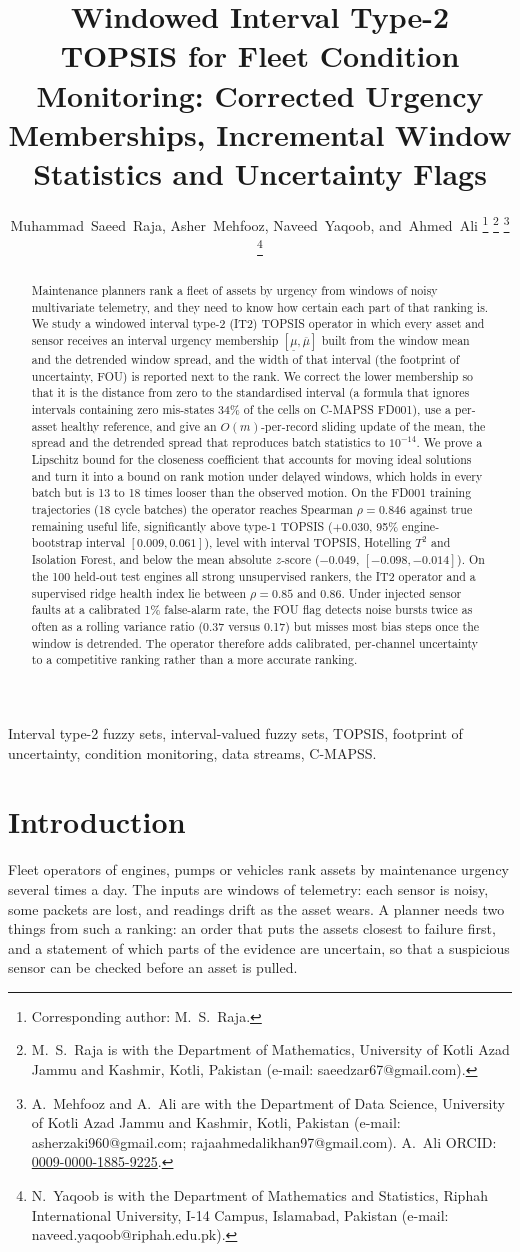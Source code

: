 \documentclass[journal,10pt,twocolumn]{IEEEtran}
\title{Windowed Interval Type-2 TOPSIS for Fleet Condition Monitoring: Corrected Urgency Memberships, Incremental Window Statistics and Uncertainty Flags}
\author{Muhammad~Saeed~Raja,
        Asher~Mehfooz,
        Naveed~Yaqoob,
        and~Ahmed~Ali%
\thanks{Corresponding author: M.~S.~Raja.}%
\thanks{M.~S.~Raja is with the Department of Mathematics, University of Kotli Azad Jammu and Kashmir, Kotli, Pakistan (e-mail: saeedzar67@gmail.com).}%
\thanks{A.~Mehfooz and A.~Ali are with the Department of Data Science, University of Kotli Azad Jammu and Kashmir, Kotli, Pakistan (e-mail: asherzaki960@gmail.com; rajaahmedalikhan97@gmail.com). A.~Ali ORCID: \href{https://orcid.org/0009-0000-1885-9225}{0009-0000-1885-9225}.}%
\thanks{N.~Yaqoob is with the Department of Mathematics and Statistics, Riphah International University, I-14 Campus, Islamabad, Pakistan (e-mail: naveed.yaqoob@riphah.edu.pk).}}
\begin{document}
\maketitle
\begin{abstract}
Maintenance planners rank a fleet of assets by urgency from windows of noisy multivariate telemetry, and they need to know how certain each part of that ranking is. We study a windowed interval type-2 (IT2) TOPSIS operator in which every asset and sensor receives an interval urgency membership $[\underline{\mu},\overline{\mu}]$ built from the window mean and the detrended window spread, and the width of that interval (the footprint of uncertainty, FOU) is reported next to the rank. We correct the lower membership so that it is the distance from zero to the standardised interval (a formula that ignores intervals containing zero mis-states 34\% of the cells on C-MAPSS FD001), use a per-asset healthy reference, and give an $O(m)$-per-record sliding update of the mean, the spread and the detrended spread that reproduces batch statistics to $10^{-14}$. We prove a Lipschitz bound for the closeness coefficient that accounts for moving ideal solutions and turn it into a bound on rank motion under delayed windows, which holds in every batch but is 13 to 18 times looser than the observed motion. On the FD001 training trajectories (18 cycle batches) the operator reaches Spearman $\rho=0.846$ against true remaining useful life, significantly above type-1 TOPSIS ($+0.030$, 95\% engine-bootstrap interval $[0.009,0.061]$), level with interval TOPSIS, Hotelling $T^2$ and Isolation Forest, and below the mean absolute $z$-score ($-0.049$, $[-0.098,-0.014]$). On the 100 held-out test engines all strong unsupervised rankers, the IT2 operator and a supervised ridge health index lie between $\rho=0.85$ and $0.86$. Under injected sensor faults at a calibrated 1\% false-alarm rate, the FOU flag detects noise bursts twice as often as a rolling variance ratio (0.37 versus 0.17) but misses most bias steps once the window is detrended. The operator therefore adds calibrated, per-channel uncertainty to a competitive ranking rather than a more accurate ranking.
\end{abstract}

\begin{IEEEkeywords}
Interval type-2 fuzzy sets, interval-valued fuzzy sets, TOPSIS, footprint of uncertainty, condition monitoring, data streams, C-MAPSS.
\end{IEEEkeywords}

\section{Introduction}
Fleet operators of engines, pumps or vehicles rank assets by maintenance urgency several times a day. The inputs are windows of telemetry: each sensor is noisy, some packets are lost, and readings drift as the asset wears. A planner needs two things from such a ranking: an order that puts the assets closest to failure first, and a statement of which parts of the evidence are uncertain, so that a suspicious sensor can be checked before an asset is pulled.
\end{document}
